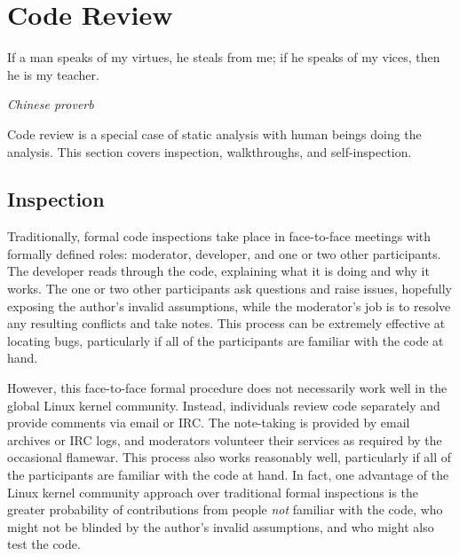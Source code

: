 \section{Code Review}
\label{sec:debugging:Code Review}
%
\epigraph{If a man speaks of my virtues, he steals from me;
	  if he speaks of my vices, then he is my teacher.}
	 {\emph{Chinese proverb}}

Code review is a special case of static analysis with human beings doing
the analysis.
This section covers inspection, walkthroughs, and self-inspection.

\subsection{Inspection}
\label{sec:debugging:Inspection}

Traditionally, formal code inspections take place in face-to-face meetings
with formally defined roles: moderator, developer, and one or two other
participants.
The developer reads through the code, explaining what it is doing and
why it works.
The one or two other participants ask questions and raise issues,
hopefully exposing the author's invalid assumptions, while the moderator's
job is to resolve any resulting conflicts and take notes.
This process can be extremely effective at locating bugs, particularly
if all of the participants are familiar with the code at hand.

However, this face-to-face formal procedure does not necessarily
work well in the global Linux kernel community.
Instead, individuals review code separately and provide comments via
email or IRC\@.
The note-taking is provided by email archives or IRC logs, and moderators
volunteer their services as required by the occasional flamewar.
This process also works reasonably well, particularly if all of the
participants are familiar with the code at hand.
In fact, one advantage of the Linux kernel community approach over
traditional formal inspections is the greater probability of contributions
from people \emph{not} familiar with the code, who might not be blinded
by the author's invalid assumptions, and who might also test the code.

